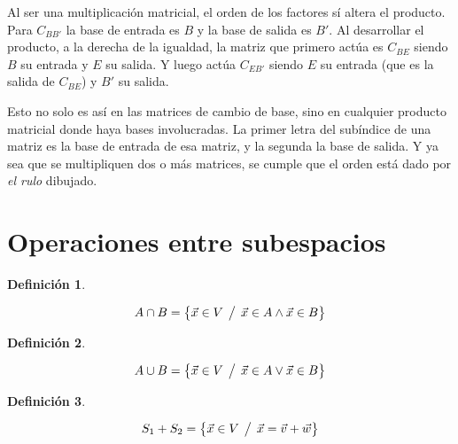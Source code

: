 \documentclass[a5paper,12pt,twoside]{book}
\newtheorem{defn}{{Definición}}[chapter]
\begin{document}
Al ser una multiplicación matricial, el orden de los factores sí altera el producto. Para $C_{BB'}$ la base de entrada es $B$ y la base de salida es $B'$. Al desarrollar el producto, a la derecha de la igualdad, la matriz que primero actúa es $C_{BE}$ siendo $B$ su entrada y $E$ su salida. Y luego actúa $C_{EB'}$ siendo $E$ su entrada (que es la salida de $C_{BE}$) y $B'$ su salida.

\begin{center}
\end{center}

Esto no solo es así en las matrices de cambio de base, sino en cualquier producto matricial donde haya bases involucradas. La primer letra del subíndice de una matriz es la base de entrada de esa matriz, y la segunda la base de salida. Y ya sea que se multipliquen dos o más matrices, se cumple que el orden está dado por \emph{el rulo} dibujado.


\section{Operaciones entre subespacios}

\begin{mdframed}[style=MyFrame1]
    \begin{defn}
    \end{defn}
    \begin{equation*}
        A \cap B = { \left\{ {\Vec{x} \in V \hspace{1ex} \big/ \hspace{1ex} \Vec{x}\in A \land \Vec{x}\in B} \right\} }
    \end{equation*}
\end{mdframed}

\begin{mdframed}[style=MyFrame1]
    \begin{defn}
    \end{defn}
    \begin{equation*}
        A \cup B = { \left\{ {\Vec{x} \in V \hspace{1ex} \big/ \hspace{1ex} \Vec{x}\in A \lor \Vec{x}\in B} \right\} }
    \end{equation*}
\end{mdframed}

\begin{mdframed}[style=MyFrame1]
    \begin{defn}
    \end{defn}
    \begin{equation*}
        S_1 + S_2 = { \left\{ {\Vec{x} \in V \hspace{1ex} \big/ \hspace{1ex} \Vec{x}=\Vec{v}+\Vec{w}} \right\} }
    \end{equation*}
\end{mdframed}
\end{document}
